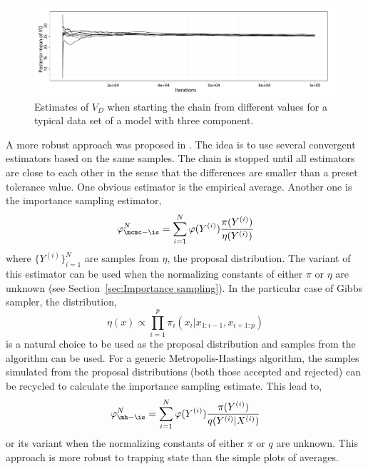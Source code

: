\begin{figure}
  \includegraphics[width=\linewidth]{fig/PET_VD}
  \caption{Estimates of $V_D$ when starting the \mcmc chain from different
    values for a typical data set of a \pet model with three component.}
  \label{fig:pet vd mean}
\end{figure}

A more robust approach was proposed in \cite{Robert:1995ge}. The idea is to
use several convergent estimators based on the same samples. The chain is
stopped until all estimators are close to each other in the sense that the
differences are smaller than a preset tolerance value. One obvious estimator
is the empirical average. Another one is the importance sampling estimator,
\begin{equation}
  \varphi_{\mcmc-\is}^N = \sum_{i=1}^N
  \varphi(Y^{(i)})\frac{\pi(Y^{(i)})}{\eta(Y^{(i)})}
\end{equation}
where $\{Y^{(i)}\}_{i=1}^N$ are samples from $\eta$, the proposal distribution.
The variant of this estimator can be used when the normalizing constants of
either $\pi$ or $\eta$ are unknown (see Section~\ref{sec:Importance
  sampling}).  In the particular case of Gibbs sampler, the distribution,
\begin{equation}
  \eta(x) \propto \prod_{i=1}^p \pi_i(x_i|x_{1:i-1},x_{i+1:p})
\end{equation}
is a natural choice to be used as the proposal distribution and samples from
the algorithm can be used. For a generic Metropolis-Hastings algorithm, the
samples simulated from the proposal distributions (both those accepted and
rejected) can be recycled to calculate the importance sampling estimate. This
lead to,
\begin{equation}
  \varphi_{\mh-\is}^N = \sum_{i=1}^N
  \varphi(Y^{(i)})\frac{\pi(Y^{(i)})}{q(Y^{(i)}|X^{(i)})}
  \label{eq:sn is}
\end{equation}
or its variant when the normalizing constants of either $\pi$ or $q$ are
unknown. This approach is more robust to trapping state than the simple plots
of averages.


